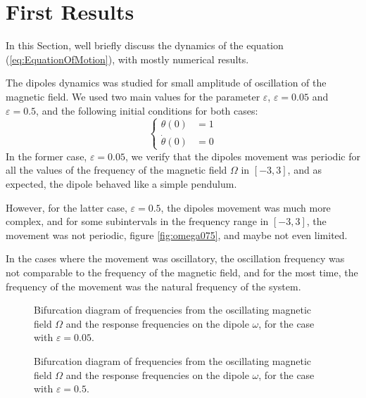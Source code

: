 \section{First Results}

In this Section, we\textquotesingle ll briefly discuss the dynamics of the equation (\ref{eq:EquationOfMotion}), with mostly numerical results. 

The dipole\textquotesingle s dynamics was studied for small amplitude of oscillation of the magnetic field. We used two main values for the parameter $\varepsilon$, $\varepsilon = 0.05$ and $\varepsilon = 0.5$, and the following initial conditions for both cases:
\begin{equation}
    \begin{cases}
        \theta (0) &= 1\\        
        \dot{\theta}(0) &= 0
    \end{cases}
\end{equation} 
In the former case, $\varepsilon = 0.05$, we verify that the dipole\textquotesingle s movement was periodic for all the values of the frequency of the magnetic field $\Omega$ in $[-3,3]$, and as expected, the dipole behaved like a simple pendulum. 

However, for the latter case, $\varepsilon = 0.5$, the dipole\textquotesingle s movement was much more complex, and for some subintervals in the frequency range in $[-3,3]$, the movement was not periodic, figure \ref{fig:omega075}, and maybe not even limited. 

In the cases where the movement was oscillatory, the oscillation frequency was not comparable to the frequency of the magnetic field, and for the most time, the frequency of the movement was the natural frequency of the system. 

\begin{figure}[ht]
    \scalebox{0.7}{}
    \caption{Bifurcation diagram of frequencies from the oscillating magnetic field $\Omega$ and the response frequencies on the dipole $\omega$, for the case with $\varepsilon = 0.05$.}
    \label{fig:big005}
\end{figure}

\begin{figure}[ht]
    \scalebox{0.7}{}
    \caption{Bifurcation diagram of frequencies from the oscillating magnetic field $\Omega$ and the response frequencies on the dipole $\omega$, for the case with $\varepsilon = 0.5$.}
    \label{fig:bif05}
\end{figure}
